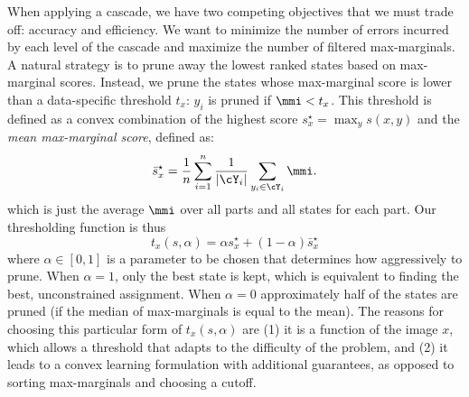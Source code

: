 When applying a cascade, we have two competing objectives that we must trade 
off: accuracy and efficiency. We want to minimize the number of errors incurred 
by each level of the cascade  and maximize the number of filtered 
max-marginals.  A natural strategy is to prune away the lowest ranked states 
based on max-marginal scores. Instead, we prune the states whose max-marginal 
score is lower than a data-specific threshold $t_x$: $y_i$ is pruned if $\mmi < 
t_x$.  This threshold is defined as a convex combination of the highest score
$s^\star_x = \max_y s(x,y)$ and the {\em mean max-marginal score}, defined as:
\begin{equation}
\bar{s}^\star_x = \frac{1}{n} \sum_{i=1}^n \frac{1}{|\cY_i|} \sum_{y_i \in 
\cY_i} \mmi.
\end{equation}
which is just the average $\mmi$ over all parts and all states for each part.  Our thresholding function is thus
\begin{equation}
t_x(s,\alpha) = \alpha s^\star_x + (1-\alpha)\bar{s}^\star_x
\end{equation}
where $\alpha\in[0,1]$ is a parameter to be chosen that 
determines how aggressively to prune. When $\alpha = 1$, only the best state is 
kept, which is equivalent to finding the best, unconstrained assignment.  When $\alpha = 0$ 
approximately half of the states are pruned (if the median of max-marginals is 
equal to the mean).  The reasons for choosing this particular form of $t_x(s,\alpha)$ are (1) it is a 
function of the image $x$, which allows a threshold that adapts to the 
difficulty of the problem, and (2) it leads to a convex learning formulation 
with additional guarantees, as opposed to sorting max-marginals and choosing a 
cutoff.

